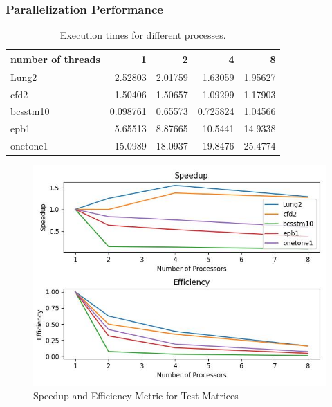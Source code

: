 \documentclass{article}
\begin{document}
\subsubsection{Parallelization Performance}
\begin{table}[ht]
\centering
\begin{tabular}{|l|r|r|r|r|}
\hline
\rowcolor{gray!20}
\textbf{number of threads}     &  \textbf{1} &  \textbf{2}  &  \textbf{4}  &  \textbf{8}  \\
\hline
Lung2    & 2.52803     & 2.01759     & 1.63059     & 1.95627     \\
\hline
cfd2     & 1.50406     & 1.50657     & 1.09299     & 1.17903     \\
\hline
bcsstm10 & 0.098761    & 0.65573     & 0.725824    & 1.04566     \\
\hline
epb1     & 5.65513     & 8.87665     & 10.5441     & 14.9338     \\
\hline
onetone1  & 15.0989     & 18.0937     & 19.8476     & 25.4774     \\
\hline
\end{tabular}
\caption{Execution times for different processes.}

\label{tab:execution_times}
\end{table}

\begin{figure}[]
\centering
\includegraphics[width=0.7\linewidth]{metrics_testmats.jpg}
\caption{Speedup and Efficiency Metric for Test Matrices}

\label{fig:metrics-testmat}
\end{figure}
\end{document}

